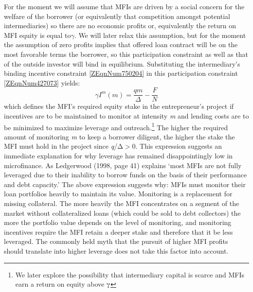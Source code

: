 \documentclass{article} %
\begin{document}
For the moment we will assume that MFIs are driven by a social concern for the welfare of the borrower (or equivalently that competition amongst potential intermediaries) so there are no economic profits or, equivalently the return on MFI equity is equal to$\gamma $.  We will later relax this assumption, but for the moment the assumption of zero profits implies that offered loan contract will be on the most favorable terms the borrower, so this participation constraint as well as that of the outside investor will bind in equilibrium.  Substituting the intermediary's binding incentive constraint \eqref{ZEqnNum750204} in  this participation constraint \eqref{ZEqnNum427073} yields:
\begin{equation} \label{ZEqnNum840214} 
\gamma I^{m} (m)=\frac{qm}{\Delta } -\frac{F}{N}  
\end{equation} 
which defines the MFI's required equity stake in the entrepreneur's project if incentives are to be maintained to monitor at intensity \textit{m} and lending costs are to be minimized to maximize leverage and outreach.\footnote{ We later explore the possibility that intermediary capital is scarce and MFIs earn a return on equity above $\mathrm{\gammaup }$ }  The higher the required amount of monitoring \textit{m }to keep a borrower diligent, the higher the stake the MFI must hold in the project since \textit{q}/$\mathrm{\Delta }$$\mathrm{>}$0.  This expression suggests an immediate explanation for why leverage has remained disappointingly low in microfinance.  As Ledgerwood (1998, page 41) explains `most MFIs are not fully leveraged due to their inability to borrow funds on the basis of their performance and debt capacity.'  The above expression suggests why:  MFIs must monitor their loan portfolios heavily to maintain its value.  Monitoring is a replacement for missing collateral. The more heavily the MFI concentrates on a segment of the market without collateralized loans (which could be sold to debt collectors) the more the portfolio value depends on the level of monitoring, and monitoring incentives require the MFI retain a deeper stake and therefore that it be less leveraged.  The commonly held myth that the pursuit of higher MFI profits should translate into higher leverage does not take this factor into account. \textit{}
\end{document}
